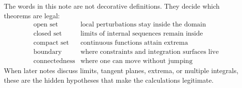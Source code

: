 The words in this note are not decorative definitions.  They decide which theorems are legal:
\[
\begin{array}{c|c}
\text{open set} & \text{local perturbations stay inside the domain}\\
\text{closed set} & \text{limits of internal sequences remain inside}\\
\text{compact set} & \text{continuous functions attain extrema}\\
\text{boundary} & \text{where constraints and integration surfaces live}\\
\text{connectedness} & \text{where one can move without jumping}
\end{array}
\]
When later notes discuss limits, tangent planes, extrema, or multiple integrals, these are the hidden hypotheses that make the calculations legitimate.

